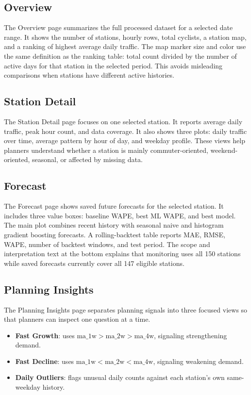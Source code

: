 \documentclass[11pt]{article}
\begin{document}
\subsection{Overview}

The Overview page summarizes the full processed dataset for a selected date range. It shows the number of stations, hourly rows, total cyclists, a station map, and a ranking of highest average daily traffic. The map marker size and color use the same definition as the ranking table: total count divided by the number of active days for that station in the selected period. This avoids misleading comparisons when stations have different active histories.

\subsection{Station Detail}

The Station Detail page focuses on one selected station. It reports average daily traffic, peak hour count, and data coverage. It also shows three plots: daily traffic over time, average pattern by hour of day, and weekday profile. These views help planners understand whether a station is mainly commuter-oriented, weekend-oriented, seasonal, or affected by missing data.

\subsection{Forecast}

The Forecast page shows saved future forecasts for the selected station. It includes three value boxes: baseline WAPE, best ML WAPE, and best model. The main plot combines recent history with seasonal naive and histogram gradient boosting forecasts. A rolling-backtest table reports MAE, RMSE, WAPE, number of backtest windows, and test period. The scope and interpretation text at the bottom explains that monitoring uses all 150 stations while saved forecasts currently cover all 147 eligible stations.

\subsection{Planning Insights}

The Planning Insights page separates planning signals into three focused views so that planners can inspect one question at a time.

\begin{itemize}
    \item \textbf{Fast Growth}: uses \(\text{ma\_1w} > \text{ma\_2w} > \text{ma\_4w}\), signaling strengthening demand.
    \item \textbf{Fast Decline}: uses \(\text{ma\_1w} < \text{ma\_2w} < \text{ma\_4w}\), signaling weakening demand.
    \item \textbf{Daily Outliers}: flags unusual daily counts against each station's own same-weekday history.
\end{itemize}
\end{document}
